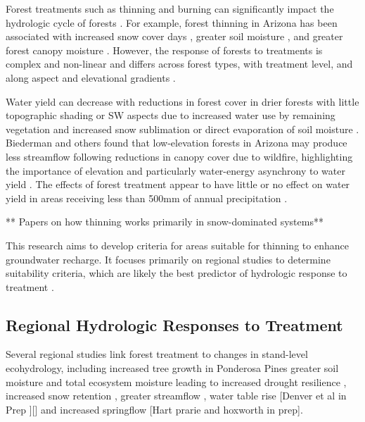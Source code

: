 \documentclass[
  number]{elsarticle}
\begin{document}
Forest treatments such as thinning and burning can significantly impact
the hydrologic cycle of forests \citep{del_campo_global_2022}. For
example, forest thinning in Arizona has been associated with increased
snow cover days
\citep{sankey_multi-scale_2015, belmonte_uav-based_2021, donager_integrating_2021},
greater soil moisture \citep{belmonte_soil_2022, sankey_thinning_2022},
and greater forest canopy moisture \citep{sankey_regionalscale_2021}.
However, the response of forests to treatments is complex and non-linear
and differs across forest types, with treatment level, and along aspect
and elevational gradients
\citep{del_campo_global_2022, biederman_streamflow_2022, zou_streamflow_2010, hibbert1979, moore_physical_2005}.

Water yield can decrease with reductions in forest cover in drier
forests with little topographic shading or SW aspects due to increased
water use by remaining vegetation and increased snow sublimation or
direct evaporation of soil moisture
\citep{biederman_recent_2015, goeking_forests_2020}. Biederman and
others \citep{biederman_streamflow_2022} found that low-elevation
forests in Arizona may produce less streamflow following reductions in
canopy cover due to wildfire, highlighting the importance of elevation
and particularly water-energy asynchrony to water yield
\citep{webb2024}. The effects of forest treatment appear to have little
or no effect on water yield in areas receiving less than 500mm of annual
precipitation
\citep{biederman_streamflow_2022, carroll_evaluating_2016, adams_ecohydrological_2012, zou_streamflow_2010, hibbert1979}.

** Papers on how thinning works primarily in snow-dominated systems**

This research aims to develop criteria for areas suitable for thinning
to enhance groundwater recharge. It focuses primarily on regional
studies to determine suitability criteria, which are likely the best
predictor of hydrologic response to treatment
\citep{wyatt_estimating_2013}.

\subsection{Regional Hydrologic Responses to
Treatment}\label{regional-hydrologic-responses-to-treatment}

Several regional studies link forest treatment to changes in stand-level
ecohydrology, including increased tree growth in Ponderosa Pines greater
soil moisture and total ecosystem moisture leading to increased drought
resilience \citep{sankey_regionalscale_2021, sankey_thinning_2022},
increased snow retention \citep{broxton_subseasonal_2023, belmonte2021},
greater streamflow \citep{baker_effects_1986}, water table rise
{[}Denver et al in Prep
{]}{[}\citep{smerdon_overview_2009}{]}\citep{schenk_impacts_2020} and
increased springflow \citep{schenk_impacts_2020}{[}Hart prarie and
hoxworth in prep{]}.
\end{document}
